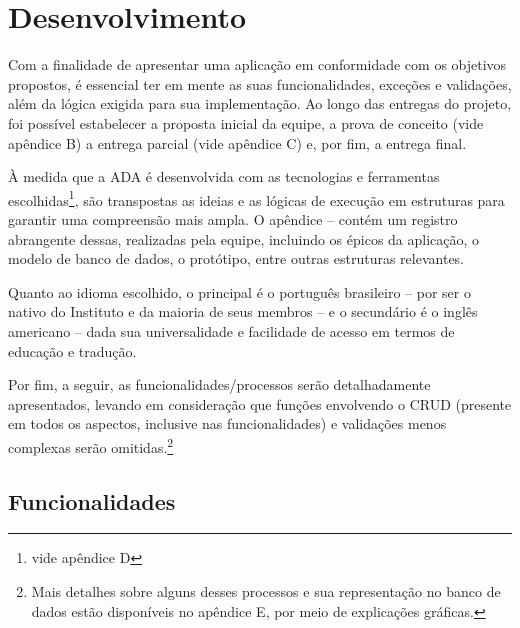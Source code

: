 \documentclass[12pt]{article}
\begin{document}
\section{Desenvolvimento}
\par Com a finalidade de apresentar uma aplicação em conformidade com os objetivos propostos, é essencial ter em mente as suas funcionalidades, exceções e validações, além da lógica exigida para sua implementação.
Ao longo das entregas do projeto, foi possível estabelecer a proposta inicial da equipe, a prova de conceito (vide apêndice B) a entrega parcial (vide apêndice C) e, por fim, a entrega final.
\par À medida que a ADA é desenvolvida com as tecnologias e ferramentas escolhidas\footnote{vide apêndice D}, são transpostas as ideias e as lógicas de execução em estruturas para garantir uma compreensão mais ampla. O apêndice -- contém um registro abrangente dessas, realizadas pela equipe, incluindo os épicos da aplicação, o modelo de banco de dados, o protótipo, entre outras estruturas relevantes.
\par Quanto ao idioma escolhido, o principal é o português brasileiro – por ser o nativo do Instituto e da maioria de seus membros – e o secundário é o inglês americano – dada sua universalidade e facilidade de acesso em termos de educação e tradução.
\par Por fim, a seguir, as funcionalidades/processos serão detalhadamente apresentados, levando em consideração que funções envolvendo o CRUD (presente em todos os aspectos, inclusive nas funcionalidades) e validações menos complexas serão omitidas.\footnote{Mais detalhes sobre alguns desses processos e sua representação no banco de dados estão disponíveis no apêndice E, por meio de explicações gráficas.}

\subsection{Funcionalidades}
\end{document}
